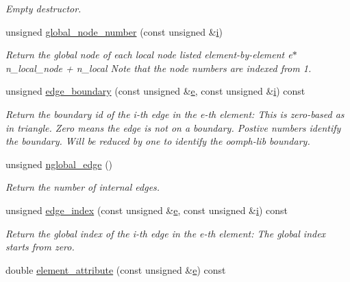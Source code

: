 \begin{DoxyCompactItemize}
\begin{DoxyCompactList}\small\item\em Empty destructor. \end{DoxyCompactList}\item 
unsigned \hyperlink{classoomph_1_1TriangleScaffoldMesh_a1083e791f7a2c839e93f5ec9cce28b9b}{global\+\_\+node\+\_\+number} (const unsigned \&\hyperlink{cfortran_8h_adb50e893b86b3e55e751a42eab3cba82}{i})
\begin{DoxyCompactList}\small\item\em Return the global node of each local node listed element-\/by-\/element e$\ast$n\+\_\+local\+\_\+node + n\+\_\+local Note that the node numbers are indexed from 1. \end{DoxyCompactList}\item 
unsigned \hyperlink{classoomph_1_1TriangleScaffoldMesh_abf7347ae13ede0f3b7b7510e86a82bf5}{edge\+\_\+boundary} (const unsigned \&\hyperlink{cfortran_8h_a37cd013acc76697829c324bdd8562d82}{e}, const unsigned \&\hyperlink{cfortran_8h_adb50e893b86b3e55e751a42eab3cba82}{i}) const
\begin{DoxyCompactList}\small\item\em Return the boundary id of the i-\/th edge in the e-\/th element\+: This is zero-\/based as in triangle. Zero means the edge is not on a boundary. Postive numbers identify the boundary. Will be reduced by one to identify the oomph-\/lib boundary. \end{DoxyCompactList}\item 
unsigned \hyperlink{classoomph_1_1TriangleScaffoldMesh_ac0f69f850608a7a7eacc5c1ce5156a3c}{nglobal\+\_\+edge} ()
\begin{DoxyCompactList}\small\item\em Return the number of internal edges. \end{DoxyCompactList}\item 
unsigned \hyperlink{classoomph_1_1TriangleScaffoldMesh_a39096c5bdd930e2f96efb0c74f70a27e}{edge\+\_\+index} (const unsigned \&\hyperlink{cfortran_8h_a37cd013acc76697829c324bdd8562d82}{e}, const unsigned \&\hyperlink{cfortran_8h_adb50e893b86b3e55e751a42eab3cba82}{i}) const
\begin{DoxyCompactList}\small\item\em Return the global index of the i-\/th edge in the e-\/th element\+: The global index starts from zero. \end{DoxyCompactList}\item 
double \hyperlink{classoomph_1_1TriangleScaffoldMesh_aa1727c3ffd9de83c8c4c8cc41f52f212}{element\+\_\+attribute} (const unsigned \&\hyperlink{cfortran_8h_a37cd013acc76697829c324bdd8562d82}{e}) const

\end{DoxyCompactItemize}
